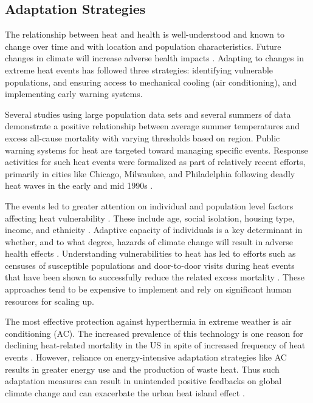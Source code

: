 \documentclass[twocol]{ametsoc}
\begin{document}
\subsection{Adaptation Strategies} \label{subsection:adaptationStrategies}
The relationship between heat and health is well-understood and known to change over time and with location and population characteristics.  Future changes in climate will increase adverse health impacts \citep{Patz2005, Luber2008}. Adapting to changes in extreme heat events has followed three strategies: identifying vulnerable populations, and ensuring access to mechanical cooling (air conditioning), and implementing early warning systems. 

Several studies using large population data sets and several summers of data demonstrate a positive relationship between average summer temperatures and excess all-cause mortality \citep{Medina2007, Basu2002, Curriero2002} with varying thresholds based on region. Public warning systems for heat are targeted toward managing specific events. Response activities for such heat events were formalized as part of relatively recent efforts, primarily in cities like Chicago, Milwaukee, and Philadelphia following deadly heat waves in the early and mid 1990s \citep{Ebi2004,Weisskopf2002}. 

The events led to greater attention on individual and population level factors affecting heat vulnerability \citep{Palecki2001}. These include age, social isolation, housing type, income, and ethnicity \citep{Browning2006,Naughton2002}. Adaptive capacity of individuals is a key determinant in whether, and to what degree, hazards of climate change will result in adverse health effects \citep{Wilhelmi2010}. Understanding vulnerabilities to heat has led to efforts such as censuses of susceptible populations and door-to-door visits during heat events that have been shown to successfully reduce the related excess mortality \citep{Li2012, Weisskopf2002}. These approaches tend to be expensive to implement and rely on significant human resources for scaling up. 

The most effective protection against hyperthermia in extreme weather is air conditioning (AC). The increased prevalence of this technology is one reason for declining heat-related mortality in the US in spite of increased frequency of heat events \citep{Davis2003}. However, reliance on energy-intensive adaptation strategies like AC results in greater energy use and the production of waste heat. Thus such adaptation measures can result in unintended positive feedbacks on global climate change and can exacerbate the urban heat island effect \citep{Salamanca2014}. 
\end{document}
